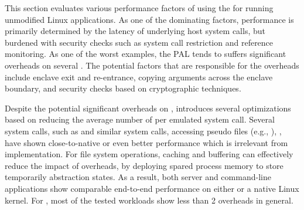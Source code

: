 \label{sec:eval:summary}

This section evaluates
various performance factors of using the \graphene{} \libos{} for running unmodified Linux applications.
As one of the dominating factors,
\thehostabi{} performance is primarily determined by the latency of underlying host system calls,
but burdened with security checks such as system call restriction and reference monitoring.
As one of the worst examples,
the \sgx{} PAL tends to suffers significant overheads on several \hostapis{}.
The potential factors that are responsible for the overheads
include enclave exit and re-entrance,
copying \hostapi{} arguments across the enclave boundary,
and security checks based on cryptographic techniques.


Despite the potential significant overheads
on \thehostabi{},
\thelibos{} introduces several optimizations
based on reducing the average number of \hostapis{} per emulated system call.
Several system calls, such as  and similar system calls,
accessing pseudo files (e.g., ),
,
have shown close-to-native or even better performance
which is irrelevant from
\thehostabi{} implementation.
For file system operations,
caching and buffering can effectively reduce the impact of \hostapi{} overheads,
by deploying spared \picoproc{} process memory
to store temporarily abstraction states.
As a result, both server and command-line applications show comparable end-to-end performance
on either \graphene{} or a native Linux kernel.
For \graphenesgx{},
most of the tested workloads show less than 2\x{} overheads
in general.

